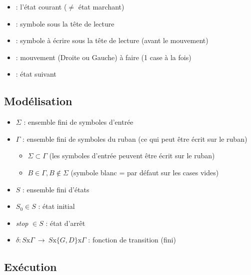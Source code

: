 \begin{itemize}
\item {} : l'état courant ($\neq$ état marchant)
\item {} : symbole sous la tête de lecture
\item {} : symbole à écrire sous la tête de lecture (avant le mouvement)
\item {} : mouvement (Droite ou Gauche) à faire (1 case à la fois)
\item {} : état suivant
\end{itemize}

\subsection{Modélisation}

\begin{itemize}
\item $\Sigma$ : ensemble fini de symboles d'entrée
\item $\Gamma$ : ensemble fini de symboles du ruban (ce qui peut être écrit sur le ruban)
	\begin{itemize}
	\item $\Sigma \subset \Gamma$ (les symboles d'entrée peuvent être écrit sur le ruban)
	\item $B \in \Gamma, B \notin \Sigma$ (symbole blanc = par défaut sur les cases vides)
	\end{itemize}
\item $S$ : ensemble fini d'états
\item $S_0 \in S$ : état initial
\item \textit{stop} $\in S$ : état d'arrêt
\item $\delta : S\text{x}\Gamma\ \rightarrow\ S\text{x}\{G,D\}\text{x}\Gamma$ : fonction de transition (fini)
\end{itemize}

\newpage
\subsection{Exécution}

